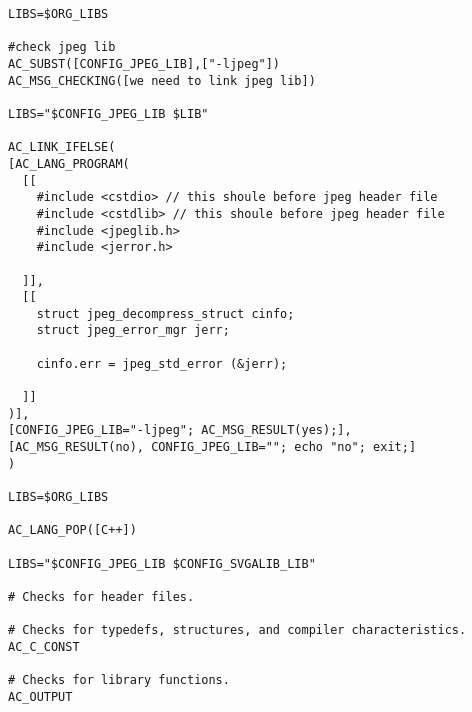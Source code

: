 \documentclass[12pt,a4]{article}
\begin{document}
\begin{CJK}{UTF8}{cwmu}
\begin{verbatim}
LIBS=$ORG_LIBS

#check jpeg lib
AC_SUBST([CONFIG_JPEG_LIB],["-ljpeg"])
AC_MSG_CHECKING([we need to link jpeg lib])

LIBS="$CONFIG_JPEG_LIB $LIB"

AC_LINK_IFELSE(
[AC_LANG_PROGRAM(
  [[
    #include <cstdio> // this shoule before jpeg header file
    #include <cstdlib> // this shoule before jpeg header file
    #include <jpeglib.h>
    #include <jerror.h>

  ]],
  [[
    struct jpeg_decompress_struct cinfo;
    struct jpeg_error_mgr jerr;

    cinfo.err = jpeg_std_error (&jerr);

  ]]
)],
[CONFIG_JPEG_LIB="-ljpeg"; AC_MSG_RESULT(yes);],
[AC_MSG_RESULT(no), CONFIG_JPEG_LIB=""; echo "no"; exit;]
)

LIBS=$ORG_LIBS

AC_LANG_POP([C++])

LIBS="$CONFIG_JPEG_LIB $CONFIG_SVGALIB_LIB"

# Checks for header files.

# Checks for typedefs, structures, and compiler characteristics.
AC_C_CONST

# Checks for library functions.
AC_OUTPUT
\end{verbatim}



\end{CJK}
\end{document}
